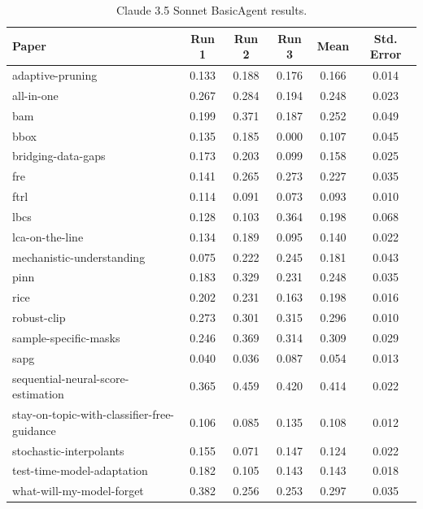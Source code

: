 \documentclass{article}
\theoremstyle{plain}
\theoremstyle{definition}
\theoremstyle{remark}
\begin{document}
\begin{table}[tb]
\caption{Claude 3.5 Sonnet BasicAgent results.}
\label{tab:claude-results-basic}
\vskip 0.15in
\begin{center}
\begin{small}
\begin{sc}
\begin{tabular}{l c c c c c}
\toprule
\textbf{Paper} & \textbf{Run 1} & \textbf{Run 2} & \textbf{Run 3} & \textbf{Mean} & \textbf{Std. Error} \\
\midrule
adaptive-pruning & 0.133 & 0.188 & 0.176 & 0.166 & 0.014 \\
all-in-one & 0.267 & 0.284 & 0.194 & 0.248 & 0.023 \\
bam & 0.199 & 0.371 & 0.187 & 0.252 & 0.049 \\
bbox & 0.135 & 0.185 & 0.000 & 0.107 & 0.045 \\
bridging-data-gaps & 0.173 & 0.203 & 0.099 & 0.158 & 0.025 \\
fre & 0.141 & 0.265 & 0.273 & 0.227 & 0.035 \\
ftrl & 0.114 & 0.091 & 0.073 & 0.093 & 0.010 \\
lbcs & 0.128 & 0.103 & 0.364 & 0.198 & 0.068 \\
lca-on-the-line & 0.134 & 0.189 & 0.095 & 0.140 & 0.022 \\
mechanistic-understanding & 0.075 & 0.222 & 0.245 & 0.181 & 0.043 \\
pinn & 0.183 & 0.329 & 0.231 & 0.248 & 0.035 \\
rice & 0.202 & 0.231 & 0.163 & 0.198 & 0.016 \\
robust-clip & 0.273 & 0.301 & 0.315 & 0.296 & 0.010 \\
sample-specific-masks & 0.246 & 0.369 & 0.314 & 0.309 & 0.029 \\
sapg & 0.040 & 0.036 & 0.087 & 0.054 & 0.013 \\
sequential-neural-score-estimation & 0.365 & 0.459 & 0.420 & 0.414 & 0.022 \\
stay-on-topic-with-classifier-free-guidance & 0.106 & 0.085 & 0.135 & 0.108 & 0.012 \\
stochastic-interpolants & 0.155 & 0.071 & 0.147 & 0.124 & 0.022 \\
test-time-model-adaptation & 0.182 & 0.105 & 0.143 & 0.143 & 0.018 \\
what-will-my-model-forget & 0.382 & 0.256 & 0.253 & 0.297 & 0.035 \\
\bottomrule
\end{tabular}
\end{sc}
\end{small}
\end{center}
\vskip -0.1in
\end{table}
\end{document}
